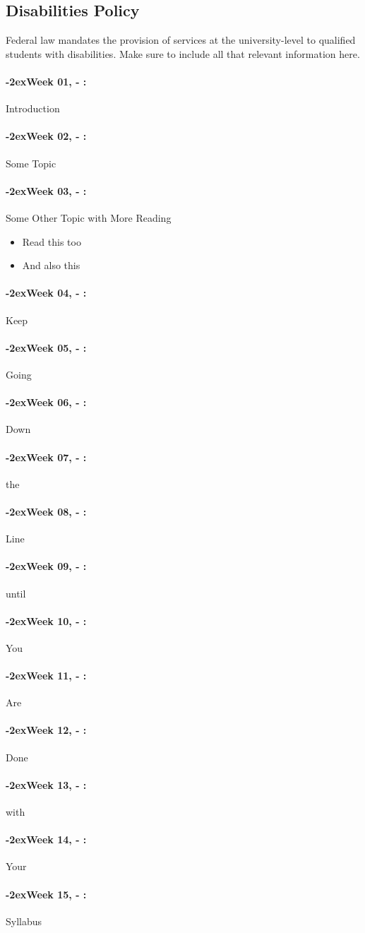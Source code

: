 \documentclass[11pt]{article}
\newcommand{\week}[1]{%
  \paragraph*{\kern-2ex\quad #1, \syldate{\today} - \AdvanceDate[4]\syldate{\today}:}%
  \ifdim\wd1=\wd\MONDAY
    \AdvanceDate[7]
  \else
    \AdvanceDate[7]
  \fi%
}
\begin{document}
\subsection*{Disabilities Policy}

Federal law mandates the provision of services at the university-level to qualified students with disabilities. Make sure to include all that relevant information here.


\newpage

\SetDate[10/08/2015]
\week{Week 01} Introduction
\week{Week 02} Some Topic


\week{Week 03} Some Other Topic with More Reading

\begin{itemize}
\item Read this too
\item And also this
\end{itemize}

\week{Week 04} Keep
\week{Week 05} Going
\week{Week 06} Down
\week{Week 07} the
\week{Week 08} Line
\week{Week 09} until
\week{Week 10} You
\week{Week 11} Are
\week{Week 12} Done
\week{Week 13} with
\week{Week 14} Your
\week{Week 15} Syllabus
\end{document}
